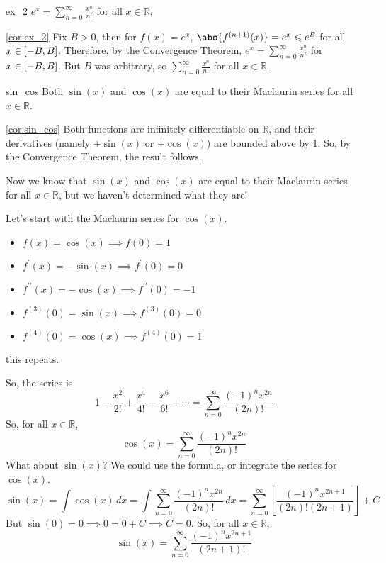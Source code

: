 \begin{Corollary}{}{ex_2}
    $ \displaystyle  e^x=\sum\limits_{n=0}^{\infty}\frac{x^n}{n!} $
    for all $ x\in\mathbb{R} $.
\end{Corollary}
\begin{Proof}{\ref{cor:ex_2}}{}
    Fix $ B>0 $, then for $ f(x)=e^x $, $ \abs{f^{(n+1)}(x)}=e^x\leqslant e^B $
    for all $ x\in\interval{-B}{B} $. Therefore, by the Convergence
    Theorem, $ \displaystyle e^x=\sum\limits_{n=0}^{\infty} \frac{x^n}{n!}  $ for $ x\in\interval{-B}{B} $.
    But $ B $ was arbitrary, so $ \displaystyle\sum\limits_{n=0}^{\infty} \frac{x^n}{n!} $
    for all $ x\in\mathbb{R} $.
\end{Proof}

\begin{Corollary}{}{sin_cos}
    Both $ \sin(x) $ and $ \cos(x) $ are equal to their Maclaurin
    series for all $ x\in\mathbb{R} $.
\end{Corollary}

\begin{Proof}{\ref{cor:sin_cos}}{}
    Both functions are infinitely differentiable on
    $ \mathbb{R} $, and their derivatives (namely $ \pm \sin(x) $ or $ \pm\cos(x) $)
    are bounded above by 1. So, by the Convergence Theorem,
    the result follows.
\end{Proof}

Now we know that $ \sin(x) $ and $ \cos(x) $ are equal to their
Maclaurin series for all $ x\in\mathbb{R} $, but we haven't
determined what they are!

Let's start with the Maclaurin series for $ \cos(x) $.
\begin{itemize}
    \item $ f(x)=\cos(x)\implies f(0)=1 $
    \item $ f^\prime(x)=-\sin(x)\implies f^\prime(0)=0 $
    \item $ f^{\prime\prime}(x)=-\cos(x)\implies f^{\prime\prime}(0)=-1 $
    \item $ f^{(3)}(0)=\sin(x)\implies f^{(3)}(0)=0 $
    \item $ f^{(4)}(0)=\cos(x)\implies f^{(4)}(0)=1 $
\end{itemize}
this repeats.

So, the series is
\[ 1-\frac{x^2}{2!} +\frac{x^4}{4!} -\frac{x^6}{6!} +\cdots=
    \sum\limits_{n=0}^{\infty} \frac{(-1)^n x^{2n}}{(2n)!}  \]
So, for all $ x\in\mathbb{R} $,
\[ \cos(x)=\sum\limits_{n=0}^{\infty}\frac{(-1)^n x^{2n}}{(2n)!}   \]
What about $ \sin(x) $? We could use the formula, or integrate the
series for $ \cos(x) $.
\[ \sin(x)=\int \cos(x)\, d{x} =
    \int \sum\limits_{n=0}^{\infty} \frac{(-1)^n x^{2n}}{(2n)!} \, d{x}
    =\sum\limits_{n=0}^{\infty} \left[ \frac{(-1)^n x^{2n+1}}{(2n)!(2n+1)} \right]+C  \]
But $ \sin(0)=0\implies 0=0+C\implies C=0 $. So, for all $ x\in\mathbb{R} $,
\[ \sin(x)=\sum\limits_{n=0}^{\infty} \frac{(-1)^n x^{2n+1}}{(2n+1)!}  \]

